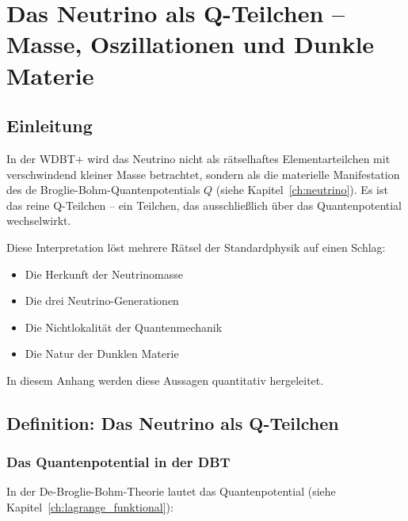 
\chapter{Das Neutrino als Q-Teilchen – Masse, Oszillationen und Dunkle Materie}
\label{app:neutrino_oszillation}

\section{Einleitung}
\label{app:neutrino_oszillation_einleitung}

In der WDBT+ wird das Neutrino nicht als rätselhaftes Elementarteilchen mit 
verschwindend kleiner Masse betrachtet, sondern als die materielle Manifestation 
des de Broglie-Bohm-Quantenpotentials $Q$ (siehe Kapitel~\ref{ch:neutrino}). Es ist das reine 
Q-Teilchen – ein Teilchen, das ausschließlich über das Quantenpotential wechselwirkt.

Diese Interpretation löst mehrere Rätsel der Standardphysik auf einen Schlag:
\begin{itemize}
    \item Die Herkunft der Neutrinomasse
    \item Die drei Neutrino-Generationen
    \item Die Nichtlokalität der Quantenmechanik
    \item Die Natur der Dunklen Materie
\end{itemize}

In diesem Anhang werden diese Aussagen quantitativ hergeleitet.

\section{Definition: Das Neutrino als Q-Teilchen}
\label{app:neutrino_oszillation_definition}

\subsection{Das Quantenpotential in der DBT}
\label{sub:neutrino_oszillation_quantenpotential}

In der De-Broglie-Bohm-Theorie lautet das Quantenpotential (siehe Kapitel~\ref{ch:lagrange_funktional}):

